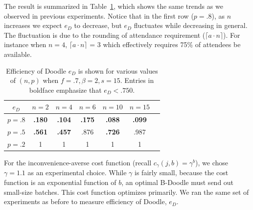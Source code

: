 The result is summarized in Table~\ref{bdoodle:table:DoodleEfficiency-lower-attendance_time_averse}, which shows the same trends as we observed in previous experiments. Notice that in the first row ($p = .8$), as $n$ increases we expect $e_{D}$ to decrease, but $e_{D}$ fluctuates while decreasing in general. The fluctuation is due to the rounding of attendance requirement ($\lceil a \cdot n \rceil$). For instance when $n = 4$, $\lceil a \cdot n \rceil$ = 3 which effectively requires 75\% of attendees be available. 
\begin{table}[h]  \small
\centering
\begin{tabular}{|c|c|c|c|c|c|c|}
	\hline
	$e_{D}$ & $n = 2$ & $n = 4$ & $n = 6$ & $ n = 10 $ & $n = 15$ \\ \hline
	$p = .8$ & \textbf{.180} & \textbf{.104} & \textbf{.175} & \textbf{.088} & \textbf{.099} \\ \hline
	$p = .5$ & \textbf{.561} & \textbf{.457} & .876 & \textbf{.726} & .987  \\ \hline
	$p = .2$ & 1 & 1 & 1 & 1 & 1\\ \hline	
\end{tabular}
\caption{Efficiency of Doodle $e_{D}$ is shown for various values of $(n, p)$ when $f = .7, \beta=2, s = 15$.
Entries in boldface emphasize that $e_{D} < .750$.
} \label{bdoodle:table:DoodleEfficiency-lower-attendance_time_averse}
\end{table}

For the inconvenience-averse cost function (recall $c_{\gamma}(j, b) = \gamma^{b}$), we chose $\gamma = 1.1$ as an experimental choice. While $\gamma$ is fairly small, because the cost function is an exponential function of $b$, an optimal B-Doodle must send out small-size batches. This cost function optimizes \Inconveniences primarily. We ran the same set of experiments as before to measure efficiency of Doodle, $e_{D}$. 

